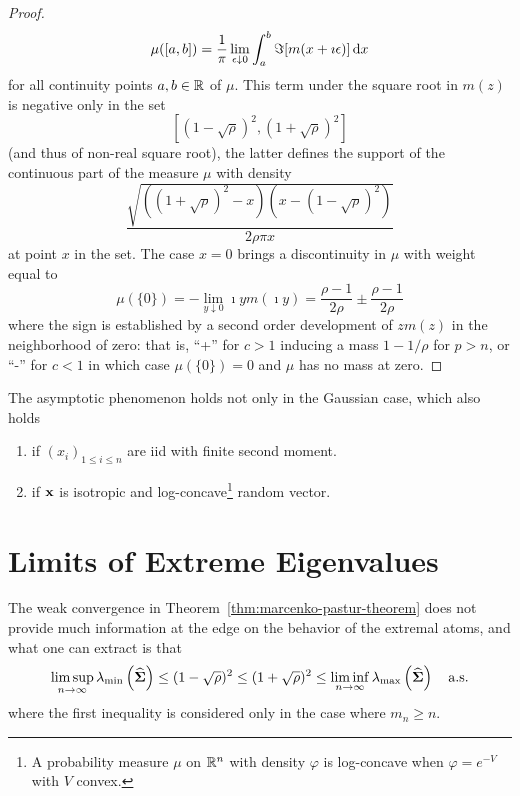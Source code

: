 \begin{proof}
	\begin{equation*}
		\mu([a,b])=\frac{1}{\pi}\lim_{\epsilon\downarrow 0}\int_{a}^{b}\Im[m(x+\imath\epsilon)]\mathop{}\!\mathrm{d} x
	\end{equation*}
	for all continuity points \(a,b\in\mathbb{R}\) of \(\mu\). This term under the square root in \(m(z)\) is negative only in the set
	\begin{equation*}
		\left[(1-\sqrt{\rho})^{2},(1+\sqrt{\rho})^{2}\right]
	\end{equation*}
	(and thus of non-real square root), the latter defines the support of the continuous part of the measure \(\mu\) with density
	\begin{equation*}
		\frac{\sqrt{\left((1+\sqrt{\rho})^{2}-x\right)\left(x-(1-\sqrt{\rho})^{2}\right)}}{2\rho\pi x}
	\end{equation*}
	at point \(x\) in the set. The case \(x=0\) brings a discontinuity in \(\mu\) with weight equal to
	\begin{equation*}
		\mu(\{0\})=-\lim_{y\downarrow 0}\imath ym(\imath y)=\frac{\rho-1}{2\rho}\pm\frac{\rho-1}{2\rho}
	\end{equation*}
	where the sign is established by a second order development of \(z m(z)\) in the neighborhood of zero: that is, ``+'' for \(c>1\) inducing a mass \(1-1/\rho\) for \(p>n\), or ``-'' for \(c<1\) in which case \(\mu(\{0\})=0\) and \(\mu\) has no mass at zero.
\end{proof}

\begin{remark}
	The asymptotic phenomenon holds not only in the Gaussian case, which also holds
	\begin{enumerate}
		\item if \(\left(x_{i}\right)_{1\leq i\leq n}\) are iid with finite second moment.
		\item if \(\mathbf{x}\) is isotropic and log-concave\footnote{A probability measure \(\mu\) on \(\mathbb{R}^{n}\) with density \(\varphi\) is log-concave when \(\varphi=e^{-V}\) with \(V\) convex.} random vector.
	\end{enumerate}
\end{remark}

\section{Limits of Extreme Eigenvalues}

The weak convergence in Theorem~\ref{thm:marcenko-pastur-theorem} does not provide much information at the edge on the behavior of the extremal atoms, and what one can extract is that
\begin{equation}
	\limsup_{n\rightarrow\infty}\lambda_{\min}\left(\widehat{\boldsymbol{\Sigma}}\right)\leq(1-\sqrt{\rho})^{2}\leq(1+\sqrt{\rho})^{2}\leq\liminf_{n\rightarrow\infty}\lambda_{\max}\left(\widehat{\boldsymbol{\Sigma}}\right)\quad\text{a.s.}
\end{equation}
where the first inequality is considered only in the case where \(m_{n}\geq n\).

